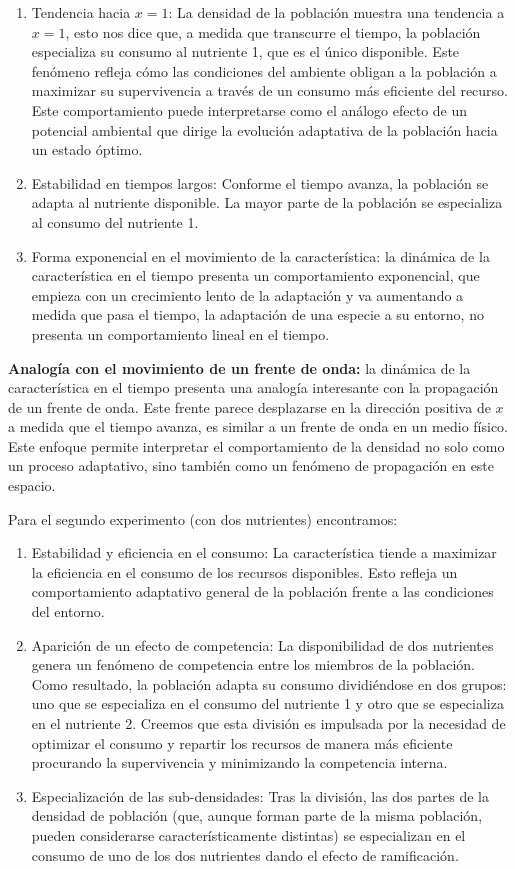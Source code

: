 \begin{enumerate}
	\item Tendencia hacia $x=1$: La densidad de la población muestra una tendencia a $x=1$, esto nos dice que, a medida que transcurre el tiempo, la población especializa su consumo al nutriente 1, que es el único disponible. Este fenómeno refleja cómo las condiciones del ambiente obligan a la población a maximizar su supervivencia a través de un consumo más eficiente del recurso. Este comportamiento puede interpretarse como el análogo efecto de un potencial ambiental que dirige la evolución adaptativa de la población hacia un estado óptimo.
	\item Estabilidad en tiempos largos: Conforme el tiempo avanza, la población se adapta al nutriente disponible. La mayor parte de la población se especializa al consumo del nutriente 1.
	\item Forma exponencial en el movimiento de la característica: la dinámica de la característica en el tiempo presenta un comportamiento exponencial, que empieza con un crecimiento lento de la adaptación y va aumentando a medida que pasa el tiempo, la adaptación de una especie a su entorno, no presenta un comportamiento lineal en el tiempo.
\end{enumerate}

\textbf{Analogía con el movimiento de un frente de onda:} la dinámica de la característica en el tiempo presenta una analogía interesante con la propagación de un frente de onda. Este frente parece desplazarse en la dirección positiva de $x$ a medida que el tiempo avanza, es similar a un frente de onda en un medio físico. Este enfoque permite interpretar el comportamiento de la densidad no solo como un proceso adaptativo, sino también como un fenómeno de propagación en este espacio.

Para el segundo experimento (con dos nutrientes) encontramos:
\begin{enumerate}
	\item Estabilidad y eficiencia en el consumo:
	      La característica tiende a maximizar la eficiencia en el consumo de los recursos disponibles. Esto refleja un comportamiento adaptativo general de la población frente a las condiciones del entorno.

	\item Aparición de un efecto de competencia:
	      La disponibilidad de dos nutrientes genera un fenómeno de competencia entre los miembros de la población. Como resultado, la población adapta su consumo dividiéndose en dos grupos: uno que se especializa en el consumo del nutriente 1 y otro que se especializa en el nutriente 2. Creemos que esta división es impulsada por la necesidad de optimizar el consumo y repartir los recursos de manera más eficiente procurando la supervivencia y minimizando la competencia interna.

	\item Especialización de las sub-densidades:
	      Tras la división, las dos partes de la densidad de población (que, aunque forman parte de la misma población, pueden considerarse característicamente distintas) se especializan en el consumo de uno de los dos nutrientes dando el efecto de ramificación.
\end{enumerate}

